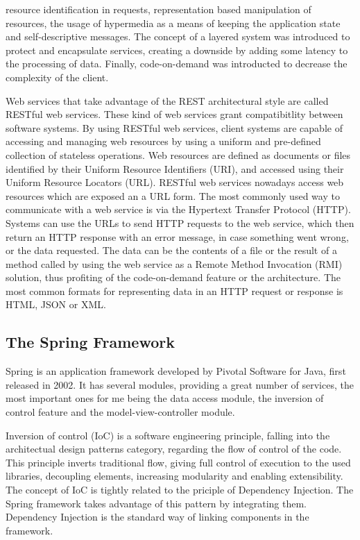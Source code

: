 \documentclass[12pt,a4paper,twoside]{report}
\begin{document}
resource identification in requests, representation based manipulation of resources, the usage of hypermedia as a means of keeping the application state and self-descriptive messages. The concept of a layered system was introduced to protect and encapsulate services, creating a downside by adding some latency to the processing of data. Finally, code-on-demand was introducted to decrease the complexity of the client.

Web services that take advantage of the REST architectural style are called RESTful web services. These kind of web services grant compatibitlity between software systems. By using RESTful web services, client systems are capable of accessing and managing web resources by using a uniform and pre-defined collection of stateless operations. Web resources are defined as documents or files identified by their Uniform Resource Identifiers (URI), and accessed using their Uniform Resource Locators (URL). RESTful web services nowadays access web resources which are exposed an a URL form. The most commonly used way to communicate with a web service is via the Hypertext Transfer Protocol (HTTP). Systems can use the URLs to send HTTP requests to the web service, which then return an HTTP response with an error message, in case something went wrong, or the data requested. The data can be the contents of a file or the result of a method called by using the web service as a Remote Method Invocation (RMI) solution, thus profiting of the code-on-demand feature or the architecture. The most common formats for representing data in an HTTP request or response is HTML, JSON or XML.


\subsection{The Spring Framework}
Spring is an application framework developed by Pivotal Software for Java, first released in 2002. It has several modules, providing a great number of services, the most important ones for me being the data access module, the inversion of control feature and the model-view-controller module.

Inversion of control (IoC) is a software engineering principle, falling into the architectual design patterns category, regarding the flow of control of the code. This principle inverts traditional flow, giving full control of execution to the used libraries, decoupling elements, increasing modularity and enabling extensibility. The concept of IoC is tightly related to the priciple of Dependency Injection. The Spring framework takes advantage of this pattern by integrating them. Dependency Injection is the standard way of linking components in the framework.
\end{document}
